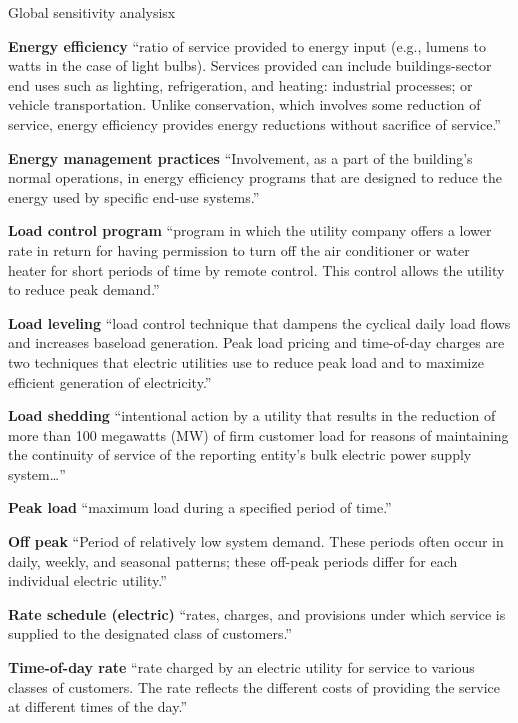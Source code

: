 \documentclass[10pt]{article}
\begin{document}
\begin{labeling}{Global sensitivity analysisx}
\item [\textbf{Energy efficiency}]  ``ratio of service provided to energy input (e.g., lumens to watts in the case of light bulbs). Services provided can include buildings-sector end uses such as lighting, refrigeration, and heating: industrial processes; or vehicle transportation. Unlike conservation, which involves some reduction of service, energy efficiency provides energy reductions without sacrifice of service.'' \cite{EIAglossary}

\item [\textbf{Energy management practices}]  ``Involvement, as a part of the building's normal operations, in energy efficiency programs that are designed to reduce the energy used by specific end-use systems.''  \cite{EIAglossary}

\item [\textbf{Load control program}] ``program in which the utility company offers a lower rate in return for having permission to turn off the air conditioner or water heater for short periods of time by remote control. This control allows the utility to reduce peak demand.'' \cite{EIAglossary}

\item [\textbf{Load leveling}] ``load control technique that dampens the cyclical daily load flows and increases baseload generation. Peak load pricing and time-of-day charges are two techniques that electric utilities use to reduce peak load and to maximize efficient generation of electricity.'' \cite{EIAglossary}

\item [\textbf{Load shedding}] ``intentional action by a utility that results in the reduction of more than 100 megawatts (MW) of firm customer load for reasons of maintaining the continuity of service of the reporting entity's bulk electric power supply system\ldots'' \cite{EIAglossary}

\item [\textbf{Peak load}]  ``maximum load during a specified period of time.''  \cite{EIAglossary}

\item [\textbf{Off peak}]  ``Period of relatively low system demand. These periods often occur in daily, weekly, and seasonal patterns; these off-peak periods differ for each individual electric utility.''  \cite{EIAglossary}

\item [\textbf{Rate schedule (electric)}] ``rates, charges, and provisions under which service is supplied to the designated class of customers.'' \cite{EIAglossary}

\item [\textbf{Time-of-day rate}]  ``rate charged by an electric utility for service to various classes of customers. The rate reflects the different costs of providing the service at different times of the day.''  \cite{EIAglossary}

\end{labeling}
\end{document}
